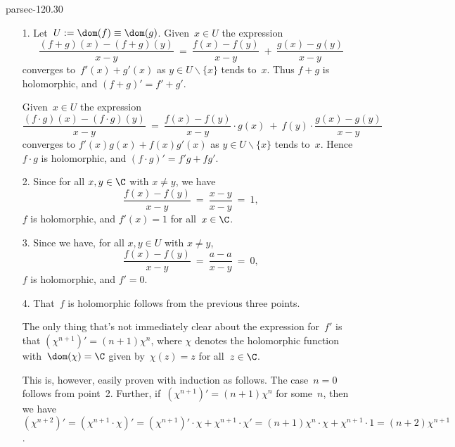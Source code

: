 \documentclass[b5page]{book}
\begin{document}
\begin{solution}{parsec-120.30}
\begin{enumerate}
\item[1.]
Let~$U:= \dom(f)\equiv\dom(g)$.
Given~$x\in U$ the expression
        \begin{equation*}
            \frac{(f+g)(x)-(f+g)(y)}{x-y}
            \ =\  \frac{f(x)-f(y)}{x-y}
            \ +\ \frac{g(x)-g(y)}{x-y}
        \end{equation*}
        converges to~$f'(x)+g'(x)$ as $y\in U\backslash\{x\}$
        tends to~$x$.  
Thus $f+g$ is holomorphic, and $(f+g)'=f'+g'$.

Given~$x\in U$ the expression
\begin{equation*}
            \frac{(f\cdot g)(x)-(f\cdot g)(y)}{x-y}
            \ =\  \frac{f(x)-f(y)}{x-y}\cdot g(x)
            \ +\ f(y)\cdot \frac{g(x)-g(y) }{x-y}
\end{equation*}
converges to $f'(x)g(x)+f(x)g'(x)$ as $y\in U\backslash\{x\}$
tends to~$x$. Hence~$f\cdot g$ is holomorphic, 
        and $(f\cdot g)' = f'g + fg'$.

\item[2.]
Since for all $x,y\in\C$ with $x\neq y$, 
        we have
\begin{equation*}
\frac{f(x)-f(y)}{x-y} \ = \ 
    \frac{x-y}{x-y} \ = \ 1,
\end{equation*}
$f$ is holomorphic, and $f'(x)=1$ for all~$x\in \C$.

\item[3.]
    Since we have, for all $x,y\in U$ with $x\neq y$,
\begin{equation*}
\frac{f(x)-f(y)}{x-y} \ = \ 
    \frac{a-a}{x-y} \ = \ 0,
\end{equation*}
$f$ is holomorphic, and $f'=0$.

\item[4.]
That~$f$ is holomorphic follows from the previous three points.

The only thing that's not immediately clear
about the expression for~$f'$
is that $(\chi^{n+1})'=(n+1)\chi^n$,
where $\chi$ denotes the holomorphic
function with~$\dom(\chi)=\C$
given by~$\chi(z)=z$ for all~$z\in \C$.

This is, however, easily proven with induction as follows.
The case~$n=0$ follows from point~2.
Further, if~$(\chi^{n+1})'=(n+1)\chi^n$
        for some~$n$,
        then we have~$(\chi^{n+2})'
        = (\chi^{n+1}\cdot\chi)'
        = (\chi^{n+1})'\cdot \chi + \chi^{n+1}\cdot\chi'
        = (n+1)\chi^n\cdot \chi + \chi^{n+1}\cdot 1
        = (n+2)\chi^{n+1}$.
\end{enumerate}
\end{solution}
\end{document}
